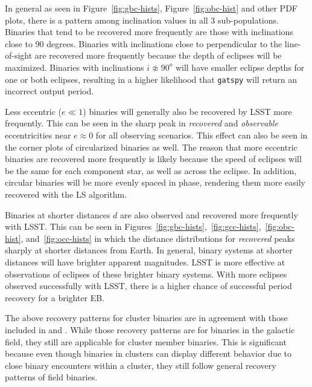 \documentclass[twocolumn]{aastex63}
\begin{document}
In general as seen in Figure~\ref{fig:gbc-hists}, Figure~\ref{fig:obc-hist} and other PDF plots, there is a pattern among inclination values in all 3 sub-populations. Binaries that tend to be recovered more frequently are those with inclinations close to 90 degrees. Binaries with inclinations close to perpendicular to the line-of-sight are recovered more frequently because the depth of eclipses will be maximized. Binaries with inclinations $i \not\approx 90^o$ will have smaller eclipse depths for one or both eclipses, resulting in a higher likelihood that \texttt{gatspy} will return an incorrect output period.

Less eccentric ($e \ll 1$) binaries will generally also be recovered by LSST more frequently. This can be seen in the sharp peak in \textit{recovered} and \textit{observable} eccentricities near $e \approx 0$ for all observing scenarios. This effect can also be seen in the corner plots of circularized binaries as well. The reason that more eccentric binaries are recovered more frequently is likely because the speed of eclipses will be the same for each component star, as well as across the eclipse. In addition, circular binaries will be more evenly spaced in phase, rendering them more easily recovered with the LS algorithm.

Binaries at shorter distances $d$  are also observed and recovered more frequently with LSST. This can be seen in Figures~\ref{fig:gbc-hists},~\ref{fig:gcc-hists},~\ref{fig:obc-hist}, and~\ref{fig:occ-hists} in which the distance distributions for \textit{recovered} peaks sharply at shorter distances from Earth. In general, binary systems at shorter distances will have brighter apparent magnitudes. LSST is more effective at observations of eclipses of these brighter binary systems. With more eclipses observed successfully with LSST, there is a higher chance of successful period recovery for a brighter EB. 

The above recovery patterns for cluster binaries are in agreement with those included in \citet{2019AAS...23336317P} and \citet{2011AJ....142...52P}. While those recovery patterns are for binaries in the galactic field, they still are applicable for cluster member binaries. This is significant because even though binaries in clusters can display different behavior due to close binary encounters within a cluster, they still follow general recovery patterns of field binaries. 
\end{document}
